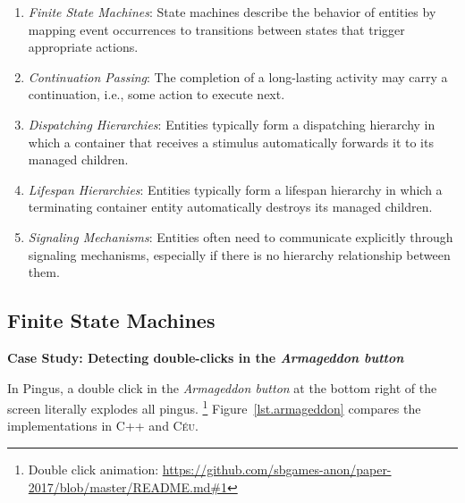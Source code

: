\documentclass{vgtc}                          %
\newcommand{\CEU}{\textsc{C\'{e}u}\xspace}
\begin{document}
\begin{enumerate}
\item \emph{Finite State Machines}:
    State machines describe the behavior of entities by mapping event
    occurrences to transitions between states that trigger appropriate actions.
\item \emph{Continuation Passing}:
    The completion of a long-lasting activity may carry a continuation, i.e.,
    some action to execute next.
\item \emph{Dispatching Hierarchies}:
    Entities typically form a dispatching hierarchy in which a container that
    receives a stimulus automatically forwards it to its managed children.
\item \emph{Lifespan Hierarchies}:
    Entities typically form a lifespan hierarchy in which a terminating
    container entity automatically destroys its managed children.
\item \emph{Signaling Mechanisms}:
    Entities often need to communicate explicitly through signaling mechanisms,
    especially if there is no hierarchy relationship between them.
\end{enumerate}

\subsection{Finite State Machines}

\textbf{Case Study: Detecting double-clicks in the \emph{Armageddon button}}


In Pingus, a double click in the \emph{Armageddon button} at the bottom right
of the screen literally explodes all pingus.%
\footnote{Double click animation: \url{https://github.com/sbgames-anon/paper-2017/blob/master/README.md#1} }
Figure~\ref{lst.armageddon} compares the implementations in C++ and \CEU.
\end{document}

